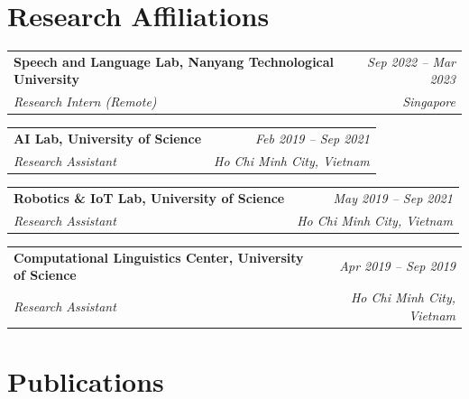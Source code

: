 \documentclass[10pt,a4paper]{article}
\makeatletter
\newcommand{\cventry}[4]{%
  \noindent
  \begin{tabular*}{\linewidth}{@{}l@{\extracolsep{\fill}}r@{}}
    {\color{accent}\textbf{#1}} & \textit{\small #2} \\
    \textit{\small #3} & \textit{\small #4}
  \end{tabular*}%
  \vspace{1pt}%
}
\makeatother
\begin{document}
\section{Research Affiliations}

\cventry{Speech and Language Lab, Nanyang Technological University}{Sep 2022 -- Mar 2023}
        {Research Intern (Remote)}{Singapore}
\vspace{-2pt}{\small Sound event detection in urban areas, project with ST Engineering.}

\vspace{3pt}
\cventry{AI Lab, University of Science}{Feb 2019 -- Sep 2021}
        {Research Assistant}{Ho Chi Minh City, Vietnam}
\vspace{-2pt}{\small Built a 10\,GB Vietnamese speech corpus; researched text normalization and phonology.}

\vspace{3pt}
\cventry{Robotics \& IoT Lab, University of Science}{May 2019 -- Sep 2021}
        {Research Assistant}{Ho Chi Minh City, Vietnam}
\vspace{-2pt}{\small Teaching assistant and coach for EVJ Makethon, FLL, and WRO robotics competitions.}

\vspace{3pt}
\cventry{Computational Linguistics Center, University of Science}{Apr 2019 -- Sep 2019}
        {Research Assistant}{Ho Chi Minh City, Vietnam}
\vspace{-2pt}{\small Teaching assistant guiding SDL Trados Studio for the English Linguistics faculty (USSH).}

\section{Publications}
\end{document}
